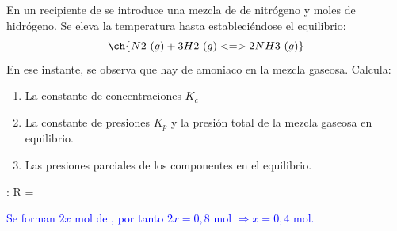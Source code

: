 \begin{exerciseEVAU}
    En un recipiente de  se introduce una mezcla de  de nitrógeno y  moles de hidrógeno. Se eleva la temperatura hasta  estableciéndose el equilibrio:
    \begin{equation*}
        \ch{N2\ (g) + 3 H2\ (g) <=> 2 NH3\ (g)}
    \end{equation*}
    En ese instante, se observa que hay  de amoniaco en la mezcla gaseosa.
    Calcula:
    \begin{enumerate}[label=\letraminuscula]
        \item La constante de concentraciones \(K_c\)
        \item La constante de presiones \(K_p\) y la presión total de la mezcla gaseosa en equilibrio.
        \item Las presiones parciales de los componentes en el equilibrio.
    \end{enumerate}
    \datos{}: R = \ctegases

    \begin{solu}

    \textcolor{blue}{Se forman \(2x\) mol de , por tanto \(2x = 0{,}8\) mol \(\Rightarrow x = 0{,}4\) mol.}


\end{solu}
\end{exerciseEVAU}
